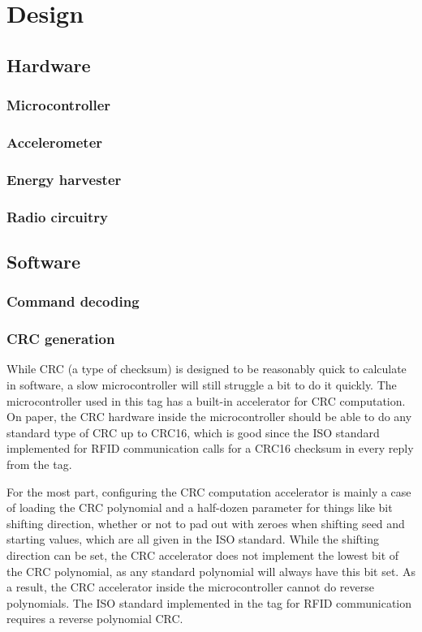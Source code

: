 \section{Design}

\subsection{Hardware}

\subsubsection{Microcontroller}
\subsubsection{Accelerometer}
\subsubsection{Energy harvester}
\subsubsection{Radio circuitry}

\subsection{Software}

\subsubsection{Command decoding}
\subsubsection{CRC generation}
While CRC (a type of checksum) is designed to be reasonably quick to calculate in software,
a slow microcontroller will still struggle a bit to do it quickly. The microcontroller used in this
tag has a built-in accelerator for CRC computation. On paper, the CRC hardware inside the microcontroller
should be able to do any standard type of CRC up to CRC16, which is good since the ISO standard
implemented for RFID communication calls for a CRC16 checksum in every reply from the tag.

For the most part, configuring the CRC computation accelerator is mainly a case of loading the
CRC polynomial and a half-dozen parameter for things like bit shifting direction, whether or not to pad
out with zeroes when shifting seed and starting values, which are all given in the ISO standard.
While the shifting direction can be set, the CRC
accelerator does not implement the lowest bit of the CRC polynomial, as any standard polynomial will always have
this bit set. As a result, the CRC accelerator inside the microcontroller cannot do reverse polynomials.
The ISO standard implemented in the tag for RFID communication requires a reverse polynomial CRC.

